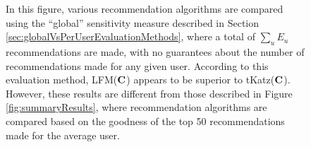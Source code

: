 \begin{figure}[h]
\begin{center}
  \end{center}
  \caption{In this figure, various recommendation algorithms are compared using the ``global'' sensitivity measure described in Section \ref{sec:globalVsPerUserEvaluationMethods}, where a total of $\sum_u E_u$ recommendations are made, with no guarantees about the number of recommendations made for any given user. According to this evaluation method, LFM($\mathbf{C}$) appears to be superior to \textsf{tKatz}($\mathbf{C}$). However, these results are different from those described in Figure \ref{fig:summaryResults}, where recommendation algorithms are compared based on the goodness of the top 50 recommendations made for the average user.}
  \label{fig:linkPredictionEvaluation}
\end{figure}

\begin{figure}[ht]
  \begin{center}

\end{center}
\end{figure}
